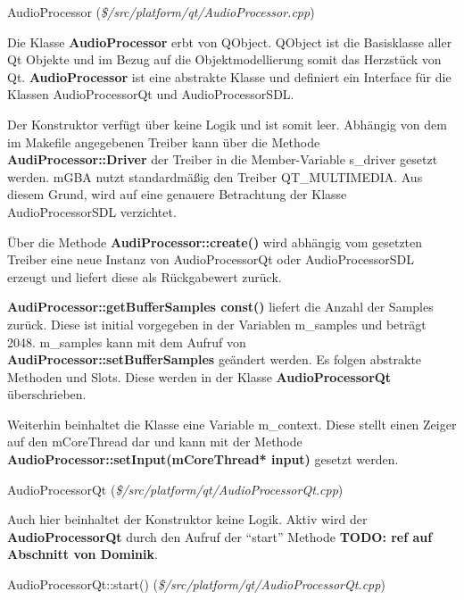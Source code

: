 \documentclass[11pt,a4paper]{scrartcl}
\begin{document}
\newpage

\vspace{5mm}
\large AudioProcessor \normalsize(\textit{\$/src/platform/qt/AudioProcessor.cpp})
\vspace{2mm}\newline

Die Klasse \textbf{AudioProcessor} erbt von QObject. QObject ist die Basisklasse aller Qt Objekte und im Bezug auf die Objektmodellierung somit das Herzst\"uck von Qt. \textbf{AudioProcessor} ist eine abstrakte Klasse und definiert
ein Interface f\"ur die Klassen AudioProcessorQt und AudioProcessorSDL.

Der Konstruktor verf\"ugt \"uber keine Logik und ist somit leer. Abh\"angig von dem im Makefile angegebenen Treiber kann \"uber die Methode \textbf{AudiProcessor::Driver} der Treiber in die Member-Variable s\_driver gesetzt werden. mGBA nutzt standardm\"a{\ss}ig den Treiber QT\_MULTIMEDIA. Aus diesem Grund, wird auf eine genauere Betrachtung
der Klasse AudioProcessorSDL verzichtet. 

\"Uber die Methode \textbf{AudiProcessor::create()} wird abh\"angig vom gesetzten Treiber eine neue Instanz von AudioProcessorQt oder AudioProcessorSDL erzeugt und liefert diese als R\"uckgabewert zur\"uck.

\textbf{AudiProcessor::getBufferSamples const()} liefert die Anzahl der Samples zur\"uck. Diese ist initial vorgegeben in der Variablen m\_samples und betr\"agt 2048. m\_samples kann mit dem Aufruf von \textbf{AudiProcessor::setBufferSamples} ge\"andert werden. Es folgen abstrakte Methoden und Slots. Diese werden in der Klasse 
\textbf{AudioProcessorQt} \"uberschrieben.

Weiterhin beinhaltet die Klasse eine Variable m\_context. Diese stellt einen Zeiger auf den mCoreThread dar und kann mit der Methode \textbf{AudioProcessor::setInput(mCoreThread* input)} gesetzt werden. 

\vspace{5mm}
\large AudioProcessorQt \normalsize(\textit{\$/src/platform/qt/AudioProcessorQt.cpp})
\vspace{2mm}\newline

Auch hier beinhaltet der Konstruktor keine Logik. Aktiv wird der \textbf{AudioProcessorQt} durch den Aufruf der "`start"' Methode \textbf{TODO: ref auf Abschnitt von Dominik}.

\vspace{5mm}
\large AudioProcessorQt::start() \normalsize(\textit{\$/src/platform/qt/AudioProcessorQt.cpp})
\vspace{2mm}\newline
\end{document}

